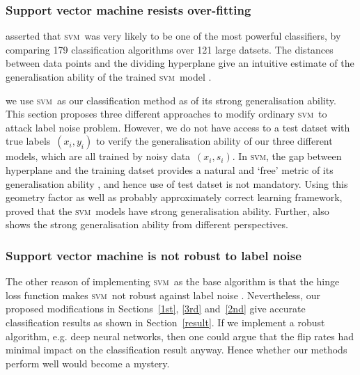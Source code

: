 \documentclass[12pt]{article} %
\newcommand{\svm}{\textsc{svm}}
\begin{document}
\subsubsection{Support vector machine resists over-fitting}\label{sec:over}
\citet{Fernandez-Delgado:2014:WNH:2627435.2697065} asserted that \svm\ was very likely to be one of the most powerful classifiers, by comparing 179 classification algorithms over 121 large datsets. The distances between data points and the dividing hyperplane give an intuitive estimate of the generalisation ability of the trained \svm\ model \citep{hastie01statisticallearning}.


we use \svm\ as our classification method as of its strong generalisation ability. %
This section proposes three different approaches to modify ordinary \svm\ to attack label noise problem. However, we do not have access to a test datset with true labels~$(x_i,y_i)$ to verify the generalisation ability of our three different models, which are all trained by noisy data~$(x_i,s_i)$. In \svm , the gap between hyperplane and the training datset provides a natural and `free' metric of its generalisation ability  \citep{hastie01statisticallearning}, and hence use of test datset is not mandatory. Using this geometry factor as well as probably approximately correct learning framework,  \citet{NIPS2012_4500} proved that the  \svm\ models have strong generalisation ability. Further,  \citep{Cortes1995,Seeger:2003:PGE:944919.944929} also shows the strong generalisation ability from different perspectives.

\subsubsection{Support vector machine is not robust to label noise}

The other reason of implementing \svm\ as the base algorithm is that the hinge loss function makes \svm\ not robust against label noise \citep{frenay2014classification}. Nevertheless, our proposed modifications in Sections~\ref{1st}, \ref{3rd} and~\ref{2nd} give accurate classification results as shown in Section~\ref{result}. If we implement a robust algorithm, e.g. deep neural networks, then one could argue that the flip rates had minimal impact on the classification result anyway. Hence whether our methods perform well would become a mystery.

\end{document}
